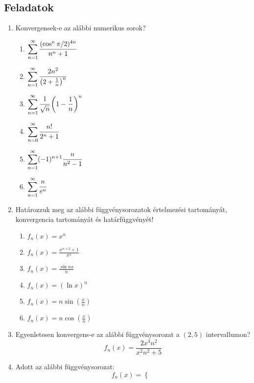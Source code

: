 \documentclass[a4paper, 12pt]{scrartcl}
\begin{document}
\subsection{Feladatok}
\begin{enumerate}
    \item Konvergensek-e az alábbi numerikus sorok?
    \begin{multicols}{2}
        \begin{enumerate}
            \item $\displaystyle \sum_{n= 1}^{\infty} \cfrac{(\cos^n \pi/2 )^{4n}}{n^n + 1}$
            \item $\displaystyle \sum_{n = 1}^{\infty} \cfrac{2n^2}{\left(2 + \frac{1}{n}\right)^n}$
            \item $\displaystyle \sum_{n = 1}^{\infty} \cfrac{1}{\sqrt{n}}\left(1-\frac{1}{n}\right)^n$
            \item $\displaystyle \sum_{n= 0}^{\infty} \cfrac{n!}{2^n + 1}$
            \item $\displaystyle \sum_{n=1}^{\infty} (-1)^{n+1} \cfrac{n}{n^2-1}$
            \item $\displaystyle \sum_{n=1}^{\infty} \cfrac{n}{e^n}$
        \end{enumerate}
    \end{multicols}
    \item Határozzuk meg az alábbi függvénysorozatok értelmezési tartományát, konvergencia tartományát és határfüggvényét!
    \begin{multicols}{2}
        \begin{enumerate}
            \item $f_n(x) = x^n$
            \item $f_n(x) = \frac{x^{n+2}+1}{x^n}$
            \item $f_n(x) = \frac{\sin nx}{n}$
            \item $f_n(x) = (\ln x)^n$
            \item $f_n(x) = n\sin\left(\frac{x}{n}\right)$
            \item $f_n(x) = n\cos\left(\frac{x}{n}\right)$
        \end{enumerate}
    \end{multicols}    
    \item Egyenletesen konvergens-e az alábbi függvénysorozat a $(2, 5)$ intervallumon?
    \[
    f_n(x) = \frac{2x^3n^2}{x^2n^2+5}
    \]
    \item Adott az alábbi függvénysorozat:
    \[
    f_n(x)= \left\{\begin{matrix}

\end{matrix}\]
\end{enumerate}
\end{document}
